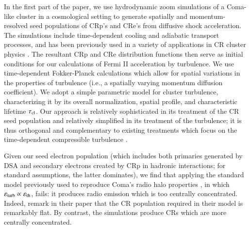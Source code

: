 \documentclass[fleqn,usenatbib,useAMS]{mnras}
\newcommand{\eps}{\varepsilon}
\begin{document}
In the first part of the paper, we use hydrodynamic zoom simulations of a Coma-like cluster in a cosmological setting to generate spatially and momentum-resolved seed populations of CRp's and CRe's from diffusive shock acceleration. The simulations include time-dependent cooling and adiabatic transport processes, and has been previously used in a variety of applications in CR cluster physics \citep{pinzke10,pinzke13}. The resultant CRp and CRe distribution functions then serve as initial conditions for our calculations of Fermi II acceleration by turbulence. We use time-dependent Fokker-Planck calculations which allow for spatial variations in the properties of turbulence (i.e., a spatially varying momentum diffusion coefficient). We adopt a simple parametric model for 
cluster turbulence, characterizing it by its overall normalization, spatial profile, and characteristic lifetime $\tau_{\rm cl}$. Our approach is relatively sophisticated in its treatment of the CR seed population and relatively simplified in its treatment of the turbulence; it is thus orthogonal and complementary to existing treatments which focus on the time-dependent compressible turbulence \citep{miniati15}.

Given our seed electron population (which includes both primaries generated by DSA and secondary electrons created by CRp in hadronic interactions; for standard assumptions, the latter dominates), we find that applying the standard model previously used to reproduce Coma's radio halo properties \citep{brunetti11}, in which $\eps_{\rm turb} \propto \eps_{\rm th}$, fails: it produces radio emission which is too centrally concentrated. Indeed, \citet{brunetti11} remark in their paper that the CR population required in their model is remarkably flat. By contrast, the simulations produce CRs which are more centrally concentrated.
\end{document}
